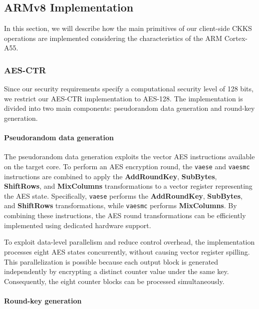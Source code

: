 \subsection{ARMv8 Implementation}
\label{work:arm}

In this section, we will describe how the main primitives of our client-side CKKS operations are implemented considering the characteristics of the ARM Cortex-A55.

\subsubsection{AES-CTR}
\label{work:aes}

Since our security requirements specify a computational security level of 128 bits, we restrict our AES-CTR implementation to AES-128. The implementation is divided into two main components: pseudorandom data generation and round-key generation.

\paragraph{Pseudorandom data generation}

The pseudorandom data generation exploits the vector AES instructions available on the target core. To perform an AES encryption round, the \texttt{vaese} and \texttt{vaesmc} instructions are combined to apply the \textbf{AddRoundKey}, \textbf{SubBytes}, \textbf{ShiftRows}, and \textbf{MixColumns} transformations to a vector register representing the AES state. Specifically, \texttt{vaese} performs the \textbf{AddRoundKey}, \textbf{SubBytes}, and \textbf{ShiftRows} transformations, while \texttt{vaesmc} performs \textbf{MixColumns}. By combining these instructions, the AES round transformations can be efficiently implemented using dedicated hardware support.

To exploit data-level parallelism and reduce control overhead, the implementation processes eight AES states concurrently, without causing vector register spilling. This parallelization is possible because each output block is generated independently by encrypting a distinct counter value under the same key. Consequently, the eight counter blocks can be processed simultaneously. %

\paragraph{Round-key generation}

